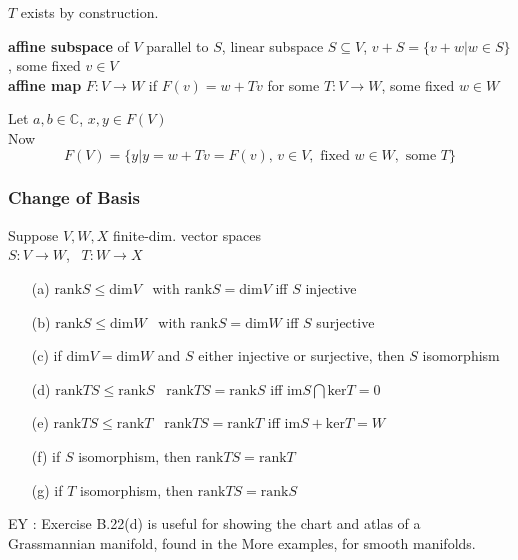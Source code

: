 $T$ exists by construction.
\hrulefill


\textbf{ affine subspace } of $V$ parallel to $S$, linear subspace $S \subseteq V$, $v + S = \lbrace v + w | w \in S \rbrace$, some fixed $v \in V$ \\

\textbf{affine map } $F: V \to W$ if $F(v) = w + Tv$ for some $T: V \to W$, some fixed $w\in W$ \\


Let $a,b \in \mathbb{C}$, $x, y \in F(V)$ \\

Now 
\[
F(V) = \lbrace y | y = w + Tv = F(v), \, v \in V, \text{ fixed } w \in W , \text{ some } T \rbrace
\]

\subsubsection{Change of Basis}




 Suppose $V,W, X$ finite-dim. vector spaces \\
$S:V\to W$, \, $T:W \to X$

\begin{enumerate}
\item[(a)] $\text{rank}S \leq \text{dim}V$ \quad \, with $\text{rank}S = \text{dim}V$ iff $S$ injective
\item[(b)] $\text{rank}S \leq \text{dim}W$ \quad \, with $\text{rank}S = \text{dim}W$ iff $S$ surjective
\item[(c)] if $\text{dim}V = \text{dim}W$ and $S$ either injective or surjective, then $S$ isomorphism 
\item[(d)] $\text{rank}TS \leq \text{rank}S$ \quad \, $\text{rank}TS = \text{rank}S$ iff $\text{im}S \bigcap \text{ker}T = 0$ 
\item[(e)] $\text{rank}TS \leq \text{rank}T$ \quad \, $\text{rank}TS = \text{rank}T$ iff $\text{im}S + \text{ker}T = W$
\item[(f)] if $S$ isomorphism, then $\text{rank}TS = \text{rank}T$
\item[(g)] if $T$ isomorphism, then $\text{rank}TS = \text{rank}S$
\end{enumerate}

EY : Exercise B.22(d) is useful for showing the chart and atlas of a Grassmannian manifold, found in the More examples, for smooth manifolds.  

